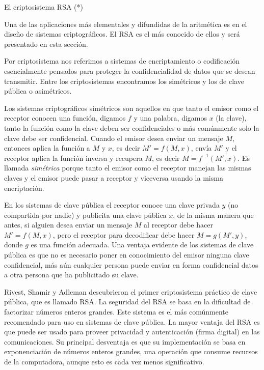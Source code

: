 \begin{section}{El criptosistema RSA (*)}


Una de las aplicaciones más elementales y difundidas de la aritmética es en el diseño de sistemas criptográficos. El RSA es el más conocido de ellos y será presentado en esta sección. 

Por criptosistema nos referimos a sistemas de encriptamiento o codificación esencialmente pensados para proteger la    confidencialidad de datos que
se desean transmitir. Entre los criptosistemas encontramos los simétricos  y los de clave pública o asimétricos.
  

Los sistemas criptográficos simétricos son aquellos en que tanto el emisor como el receptor conocen una función, digamos $f$ y una palabra, digamos $x$ (la clave), tanto la función como la clave 
deben ser confidenciales o más comúnmente solo la clave debe ser confidencial. Cuando el emisor desea enviar un mensaje $M$, entonces aplica la función a $M$ y $x$, es decir $M'=f(M,x)$,
envía $M'$ y el receptor aplica la función inversa y recupera $M$, es decir $M=f^{-1}(M',x)$. Es llamada \emph{simétrica} porque tanto el emisor como el receptor manejan las mismas claves y el emisor puede pasar a receptor y viceversa usando la misma encriptación.   

En los sistemas de clave pública el receptor conoce una clave privada $y$ (no compartida por nadie) y publicita una clave pública $x$, de la misma manera que antes,  si alguien desea enviar un mensaje $M$ al receptor debe hacer $M'=f(M,x)$, pero el receptor para decodificar debe hacer $M=g(M',y)$, donde $g$ es una función adecuada. Una ventaja evidente de los sistemas de clave pública es que no es necesario poner en conocimiento del emisor ninguna clave confidencial, más aún cualquier persona puede enviar en forma confidencial datos a otra persona que ha publicitado su clave.


Rivest, Shamir y Adleman descubrieron el primer criptosistema práctico de clave pública, que es llamado RSA. La seguridad del RSA se basa en la dificultad de factorizar números enteros grandes. Este sistema es el más comúnmente recomendado para uso en sistemas de clave pública. La mayor ventaja del RSA es que puede ser usado para proveer privacidad y autenticación (firma digital) en las comunicaciones. Su principal desventaja es que su implementación se basa en exponenciación de números enteros grandes, una operación que consume recursos de la computadora, aunque esto es cada vez menos significativo.



\end{section}
